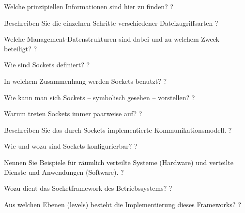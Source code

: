 \documentclass[avery5371]{flashcards}
\begin{document}
\begin{flashcard}[Dateisysteme]{Welche prinzipiellen Informationen sind hier zu finden?}
    ?
\end{flashcard}

\begin{flashcard}[Dateisysteme]{Beschreiben Sie die einzelnen Schritte verschiedener Dateizugriffsarten}
    ?
\end{flashcard}

\begin{flashcard}[Dateisysteme]{Welche Management-Datenstrukturen sind dabei und zu welchem Zweck beteiligt?}
    ?
\end{flashcard}

\begin{flashcard}[Netzwerkmanagement]{Wie sind Sockets definiert?}
    ?
\end{flashcard}

\begin{flashcard}[Netzwerkmanagement]{In welchem Zusammenhang werden Sockets benutzt?}
    ?
\end{flashcard}

\begin{flashcard}[Netzwerkmanagement]{Wie kann man sich Sockets – symbolisch gesehen – vorstellen?}
    ?
\end{flashcard}

\begin{flashcard}[Netzwerkmanagement]{Warum treten Sockets immer paarweise auf?}
    ?
\end{flashcard}

\begin{flashcard}[Netzwerkmanagement]{Beschreiben Sie das durch Sockets implementierte Kommunikationsmodell. }
    ?
\end{flashcard}

\begin{flashcard}[Netzwerkmanagement]{Wie und wozu sind Sockets konfigurierbar? }
    ?
\end{flashcard}

\begin{flashcard}[Netzwerkmanagement]{Nennen Sie Beispiele für räumlich verteilte Systeme (Hardware) und verteilte Dienste und Anwendungen (Software).}
    ?
\end{flashcard}

\begin{flashcard}[Netzwerkmanagement]{Wozu dient das Socketframework des Betriebssystems?}
    ?
\end{flashcard}

\begin{flashcard}[Netzwerkmanagement]{Aus welchen Ebenen (levels) besteht die Implementierung dieses Frameworks?}
    ?
\end{flashcard}
\end{document}
